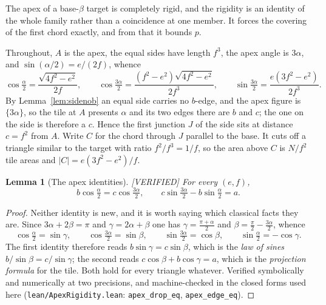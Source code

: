 \documentclass[11pt,reqno]{amsart}
\theoremstyle{plain}
\newtheorem{lemma}[theorem]{Lemma}
\theoremstyle{definition}
\newcommand{\lab}[1]{\hfill\textnormal{\footnotesize\textsc{[#1]}}}
\begin{document}
The apex of a base-$\beta$ target is completely rigid, and the rigidity is an identity of the whole
family rather than a coincidence at one member. It forces the covering of the first chord exactly, and
from that it bounds $p$.

Throughout, $A$ is the apex, the equal sides have length $f^3$, the apex angle is $3\alpha$, and
$\sin(\alpha/2)=e/(2f)$, whence
\[
\cos\tfrac{\alpha}{2}=\frac{\sqrt{4f^{2}-e^{2}}}{2f},\qquad
\cos\tfrac{3\alpha}{2}=\frac{(f^{2}-e^{2})\sqrt{4f^{2}-e^{2}}}{2f^{3}},\qquad
\sin\tfrac{3\alpha}{2}=\frac{e(3f^{2}-e^{2})}{2f^{3}} .
\]
By Lemma~\ref{lem:sidenob} an equal side carries no $b$-edge, and the apex figure is $\{3\alpha\}$, so
the tile at $A$ presents $\alpha$ and its two edges there are $b$ and $c$; the one on the side is
therefore a $c$. Hence the first junction $J$ of the side sits at distance $c=f^{2}$ from $A$. Write
$C$ for the chord through $J$ parallel to the base. It cuts off a triangle similar to the target with
ratio $f^{2}/f^{3}=1/f$, so the area above $C$ is $N/f^{2}$ tile areas and $|C|=e(3f^{2}-e^{2})/f$.

\begin{lemma}[The apex identities]\label{lem:apexid}\lab{VERIFIED}
For every $(e,f)$,
\[
b\cos\tfrac{\alpha}{2}=c\cos\tfrac{3\alpha}{2},
\qquad
c\sin\tfrac{3\alpha}{2}-b\sin\tfrac{\alpha}{2}=a .
\]
\end{lemma}

\begin{proof}
Neither identity is new, and it is worth saying which classical facts they are. Since
$3\alpha+2\beta=\pi$ and $\gamma=2\alpha+\beta$ one has $\gamma=\frac{\pi+\alpha}{2}$ and
$\beta=\frac{\pi}{2}-\frac{3\alpha}{2}$, whence
\[
\cos\tfrac{\alpha}{2}=\sin\gamma,\qquad
\cos\tfrac{3\alpha}{2}=\sin\beta,\qquad
\sin\tfrac{3\alpha}{2}=\cos\beta,\qquad
\sin\tfrac{\alpha}{2}=-\cos\gamma .
\]
The first identity therefore reads $b\sin\gamma=c\sin\beta$, which is the \emph{law of sines}
$b/\sin\beta=c/\sin\gamma$; the second reads $c\cos\beta+b\cos\gamma=a$, which is the
\emph{projection formula} for the tile. Both hold for every triangle whatever. Verified symbolically
and numerically at two precisions, and machine-checked in the closed forms used here
(\texttt{lean/ApexRigidity.lean}: \texttt{apex\_drop\_eq}, \texttt{apex\_edge\_eq}).
\end{proof}
\end{document}
